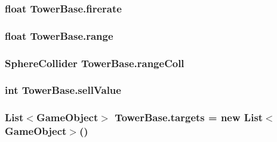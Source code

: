 \subsubsection[{\texorpdfstring{firerate}{firerate}}]{\setlength{\rightskip}{0pt plus 5cm}float Tower\+Base.\+firerate}\hypertarget{class_tower_base_a7b3c6de17168a02da71acd4124451b7e}{}\label{class_tower_base_a7b3c6de17168a02da71acd4124451b7e}
\subsubsection[{\texorpdfstring{range}{range}}]{\setlength{\rightskip}{0pt plus 5cm}float Tower\+Base.\+range}\hypertarget{class_tower_base_a9f335f125b84beaafb405210d8b24066}{}\label{class_tower_base_a9f335f125b84beaafb405210d8b24066}
\subsubsection[{\texorpdfstring{range\+Coll}{rangeColl}}]{\setlength{\rightskip}{0pt plus 5cm}Sphere\+Collider Tower\+Base.\+range\+Coll}\hypertarget{class_tower_base_a67924eeea2cd41476516edf36ebea332}{}\label{class_tower_base_a67924eeea2cd41476516edf36ebea332}
\subsubsection[{\texorpdfstring{sell\+Value}{sellValue}}]{\setlength{\rightskip}{0pt plus 5cm}int Tower\+Base.\+sell\+Value}\hypertarget{class_tower_base_a23fbeef8aae7efc0a9b32f73fc1496d6}{}\label{class_tower_base_a23fbeef8aae7efc0a9b32f73fc1496d6}
\subsubsection[{\texorpdfstring{targets}{targets}}]{\setlength{\rightskip}{0pt plus 5cm}List$<$Game\+Object$>$ Tower\+Base.\+targets = new List$<$Game\+Object$>$()}\hypertarget{class_tower_base_a2ce10cd9123a0bd4025d4f23e1d1c6c1}{}\label{class_tower_base_a2ce10cd9123a0bd4025d4f23e1d1c6c1}
